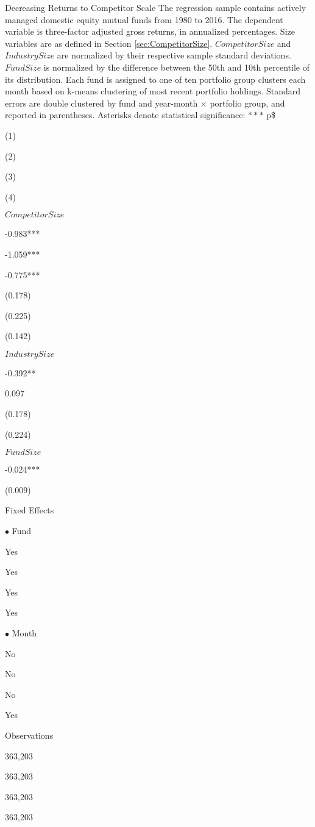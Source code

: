 \documentclass[]{book}
\theoremstyle{definition}
\theoremstyle{definition}
\theoremstyle{definition}
\theoremstyle{remark}
\begin{document}
\label{tab:mainResults}Decreasing Returns to Competitor Scale The regression
sample contains actively managed domestic equity mutual funds from 1980
to 2016. The dependent variable is three-factor adjusted gross returns,
in annualized percentages. Size variables are as defined in Section
\ref{sec:CompetitorSize}. \(CompetitorSize\) and \(IndustrySize\) are
normalized by their respective sample standard deviations. \(FundSize\)
is normalized by the difference between the 50th and 10th percentile of
its distribution. Each fund is assigned to one of ten portfolio group
clusters each month based on k-means clustering of most recent portfolio
holdings. Standard errors are double clustered by fund and year-month
\(\times\) portfolio group, and reported in parentheses. Asterisks
denote statistical significance: \(\ast\ast\ast\) p\$

\left(1\right)

\left(2\right)

\left(3\right)

\left(4\right)

\(CompetitorSize\)

-0.983***

-1.059***

-0.775***

(0.178)

(0.225)

(0.142)

\(IndustrySize\)

-0.392**

0.097

(0.178)

(0.224)

\(FundSize\)

-0.024***

(0.009)

Fixed Effects

\(\bullet\) Fund

Yes

Yes

Yes

Yes

\(\bullet\) Month

No

No

No

Yes

Observations

363,203

363,203

363,203

363,203
\end{document}

